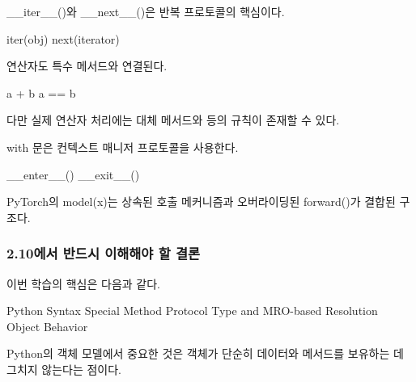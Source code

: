\begin{dhknote}
\begin{dhksmry}[centered]
__iter__()와 __next__()은 반복 프로토콜의 핵심이다.
\end{dhksmry}
\end{dhknote}

\begin{dhkcode}
iter(obj)
next(iterator)
\end{dhkcode}

\begin{dhknote}
\begin{dhksmry}[centered]
연산자도 특수 메서드와 연결된다.
\end{dhksmry}
\end{dhknote}

\begin{dhkcode}
a + b
a == b
\end{dhkcode}

다만 실제 연산자 처리에는 대체 메서드와  등의 규칙이 존재할 수 있다.

\begin{dhknote}
\begin{dhksmry}[centered]
with 문은 컨텍스트 매니저 프로토콜을 사용한다.
\end{dhksmry}
\end{dhknote}

\begin{dhkcode}
__enter__()
__exit__()
\end{dhkcode}

\begin{dhknote}
\begin{dhksmry}[centered]
PyTorch의 model(x)는 상속된 호출 메커니즘과
오버라이딩된 forward()가 결합된 구조다.
\end{dhksmry}
\end{dhknote}

\subsubsection{2.10에서 반드시 이해해야 할 결론}

이번 학습의 핵심은 다음과 같다.

\begin{dhksmry}[centered]
Python Syntax
\da
Special Method Protocol
\da
Type and MRO-based Resolution
\da
Object Behavior
\end{dhksmry}

Python의 객체 모델에서 중요한 것은 객체가 단순히 데이터와 메서드를 보유하는 데 그치지 않는다는 점이다.


